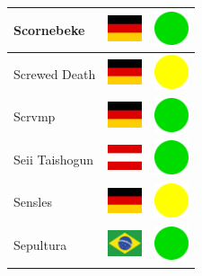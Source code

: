 \documentclass[12pt, a4paper, twoside]{report}
\begin{document}
\begin{center}
\begin{longtable}{|p{5cm}|p{2cm}|p{2cm}|}
 Scornebeke                                                 & \includegraphics[width=1cm]{../4x3/de} &   \includegraphics[width=1cm]{../likes/y} \\ \hline
 Screwed Death                                              & \includegraphics[width=1cm]{../4x3/de} &   \includegraphics[width=1cm]{../likes/m} \\ \hline
 Scrvmp                                                     & \includegraphics[width=1cm]{../4x3/de} &   \includegraphics[width=1cm]{../likes/y} \\ \hline
 Seii Taishogun                                             & \includegraphics[width=1cm]{../4x3/at} &   \includegraphics[width=1cm]{../likes/y} \\ \hline
 Sensles                                                    & \includegraphics[width=1cm]{../4x3/de} &   \includegraphics[width=1cm]{../likes/m} \\ \hline
 Sepultura                                                  & \includegraphics[width=1cm]{../4x3/br} &   \includegraphics[width=1cm]{../likes/y} \\ \hline

\end{longtable}
\end{center}
\end{document}
